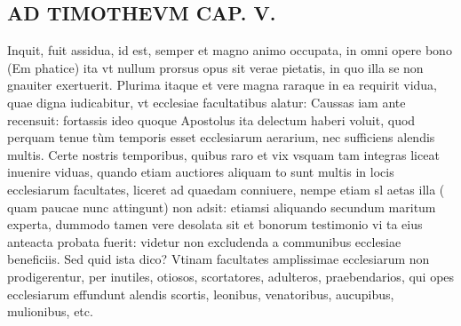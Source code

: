 \documentclass{article}
\begin{document}
\begin{pages}
\section*{AD TIMOTHEVM CAP. V. }
\marginpar{[ p.110 ]}\pstart Inquit, fuit assidua, id est, semper et magno animo occupata, in omni opere bono (Em phatice) ita vt nullum prorsus opus sit verae pietatis, in quo illa se non gnauiter exertuerit. Plurima itaque et vere magna raraque in ea requirit vidua, quae digna iudicabitur, vt ecclesiae facultatibus alatur: Caussas iam ante recensuit: fortassis ideo quoque Apostolus ita delectum haberi voluit, quod perquam tenue tùm temporis esset ecclesiarum aerarium, nec sufficiens alendis multis. Certe nostris temporibus, quibus raro et vix vsquam tam integras liceat inuenire viduas, quando etiam auctiores aliquam to sunt multis in locis ecclesiarum facultates, liceret ad quaedam conniuere, nempe etiam sl aetas illa ( quam paucae nunc attingunt) non adsit: etiamsi aliquando secundum maritum experta, dummodo tamen vere desolata sit et bonorum testimonio vi ta eius anteacta probata fuerit: videtur non excludenda a communibus ecclesiae beneficiis. Sed quid ista dico? Vtinam facultates amplissimae ecclesiarum non prodigerentur, per inutiles, otiosos, scortatores, adulteros, praebendarios, qui opes ecclesiarum effundunt alendis scortis, leonibus, venatoribus, aucupibus, mulionibus, etc.  \pend
{}
{}

\end{pages}
\end{document}
